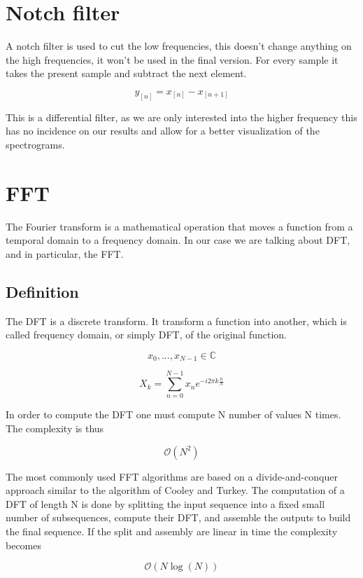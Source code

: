 \section{Notch filter}
\label{sec:notch}

A notch filter is used to cut the low frequencies, this doesn't change anything on the high frequencies, it won't be used in the final version. For every sample it takes the present sample and subtract the next element.

$$y_{[n]} = x_{[n]} - x_{[n + 1]}$$

This is a differential filter, as we are only interested into the higher frequency this has no incidence on our results and allow for a better visualization of the spectrograms.

\section{FFT}
\label{sec:FFT}

The Fourier transform is a mathematical operation that moves a function from a temporal domain to a frequency domain. In our case we are talking about \gls{DFT}, and in particular, the \gls{FFT}.

	\subsection{Definition}

	The \gls{DFT} is a discrete transform. It transform a function into another, which is called frequency domain, or simply \gls{DFT}, of the original function.

	$$ x_0,...,x_{N -1} \in \mathbb{C} $$

	$$ X_{k} = \displaystyle\sum\limits_{n = 0}^{N -1} x_{n}e^{-i 2 \pi k \frac{n}{N}} $$

	In order to compute the \gls{DFT} one must compute N number of values N times. The complexity is thus

	$$ \mathcal{O}(N^{2}) $$

	The most commonly used \gls{FFT} algorithms are based on a divide-and-conquer approach similar to the algorithm of Cooley and Turkey\cite{Cooley65}. The computation of a \gls{DFT} of length N is done by splitting the input sequence into a fixed small number of subsequences, compute their \gls{DFT}, and assemble the outputs to build the final sequence. If the split and assembly are linear in time the complexity becomes 

	$$ \mathcal{O}(N \log(N)) $$

